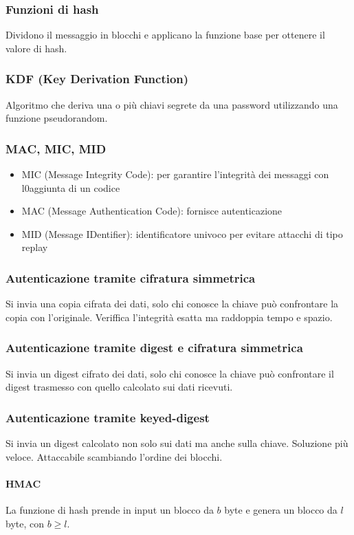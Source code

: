 \documentclass[11pt]{article}
\begin{document}
\subsubsection{Funzioni di hash}
Dividono il messaggio in blocchi e applicano la funzione base per ottenere il valore di hash.
\subsubsection{KDF (Key Derivation Function)}
Algoritmo che deriva una o più chiavi segrete da una password utilizzando una funzione pseudorandom.
\subsubsection{MAC, MIC, MID}
\begin{itemize}
    \item MIC (Message Integrity Code): per garantire l'integrità dei messaggi con l0aggiunta di un codice
    \item MAC (Message Authentication Code): fornisce autenticazione
    \item MID (Message IDentifier): identificatore univoco per evitare attacchi di tipo replay
\end{itemize}
\subsubsection{Autenticazione tramite cifratura simmetrica}
Si invia una copia cifrata dei dati, solo chi conosce la chiave può confrontare la copia con l'originale. Veriffica 
l'integrità esatta ma raddoppia tempo e spazio.
\subsubsection{Autenticazione tramite digest e cifratura simmetrica}
Si invia un digest cifrato dei dati, solo chi conosce la chiave può confrontare il digest trasmesso con quello calcolato 
sui dati ricevuti.
\subsubsection{Autenticazione tramite keyed-digest}
Si invia un digest calcolato non solo sui dati ma anche sulla chiave. Soluzione più veloce. Attaccabile scambiando l'ordine 
dei blocchi.
\paragraph*{HMAC}
La funzione di hash prende in input un blocco da $b$ byte e genera un blocco da $l$ byte, con $b\geq l$.
\end{document}
